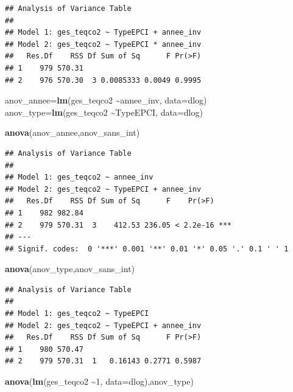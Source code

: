 \documentclass[
]{article}
\newenvironment{Shaded}{\begin{snugshade}}{\end{snugshade}}
\newcommand{\AttributeTok}[1]{\textcolor[rgb]{0.13,0.29,0.53}{#1}}
\newcommand{\DecValTok}[1]{\textcolor[rgb]{0.00,0.00,0.81}{#1}}
\newcommand{\FunctionTok}[1]{\textcolor[rgb]{0.13,0.29,0.53}{\textbf{#1}}}
\newcommand{\NormalTok}[1]{#1}
\newcommand{\OtherTok}[1]{\textcolor[rgb]{0.56,0.35,0.01}{#1}}
\newcommand{\SpecialCharTok}[1]{\textcolor[rgb]{0.81,0.36,0.00}{\textbf{#1}}}
\begin{document}
\begin{verbatim}
## Analysis of Variance Table
## 
## Model 1: ges_teqco2 ~ TypeEPCI + annee_inv
## Model 2: ges_teqco2 ~ TypeEPCI * annee_inv
##   Res.Df    RSS Df Sum of Sq      F Pr(>F)
## 1    979 570.31                           
## 2    976 570.30  3 0.0085333 0.0049 0.9995
\end{verbatim}

\begin{Shaded}
\begin{Highlighting}[]
\NormalTok{anov\_annee}\OtherTok{=}\FunctionTok{lm}\NormalTok{(ges\_teqco2 }\SpecialCharTok{\textasciitilde{}}\NormalTok{annee\_inv, }\AttributeTok{data=}\NormalTok{dlog)}
\NormalTok{anov\_type}\OtherTok{=}\FunctionTok{lm}\NormalTok{(ges\_teqco2 }\SpecialCharTok{\textasciitilde{}}\NormalTok{TypeEPCI, }\AttributeTok{data=}\NormalTok{dlog)}

\FunctionTok{anova}\NormalTok{(anov\_annee,anov\_sans\_int)}
\end{Highlighting}
\end{Shaded}

\begin{verbatim}
## Analysis of Variance Table
## 
## Model 1: ges_teqco2 ~ annee_inv
## Model 2: ges_teqco2 ~ TypeEPCI + annee_inv
##   Res.Df    RSS Df Sum of Sq      F    Pr(>F)    
## 1    982 982.84                                  
## 2    979 570.31  3    412.53 236.05 < 2.2e-16 ***
## ---
## Signif. codes:  0 '***' 0.001 '**' 0.01 '*' 0.05 '.' 0.1 ' ' 1
\end{verbatim}

\begin{Shaded}
\begin{Highlighting}[]
\FunctionTok{anova}\NormalTok{(anov\_type,anov\_sans\_int)}
\end{Highlighting}
\end{Shaded}

\begin{verbatim}
## Analysis of Variance Table
## 
## Model 1: ges_teqco2 ~ TypeEPCI
## Model 2: ges_teqco2 ~ TypeEPCI + annee_inv
##   Res.Df    RSS Df Sum of Sq      F Pr(>F)
## 1    980 570.47                           
## 2    979 570.31  1   0.16143 0.2771 0.5987
\end{verbatim}

\begin{Shaded}
\begin{Highlighting}[]
\FunctionTok{anova}\NormalTok{(}\FunctionTok{lm}\NormalTok{(ges\_teqco2 }\SpecialCharTok{\textasciitilde{}}\DecValTok{1}\NormalTok{, }\AttributeTok{data=}\NormalTok{dlog),anov\_type)}
\end{Highlighting}
\end{Shaded}
\end{document}

